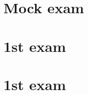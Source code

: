 \documentclass{article}
\author{Leopold Lemmermann}
\begin{document}
\createtitle

\section[2024]{Mock exam}




\section[2023]{1st exam}















\section[2022]{1st exam}


\end{document}
